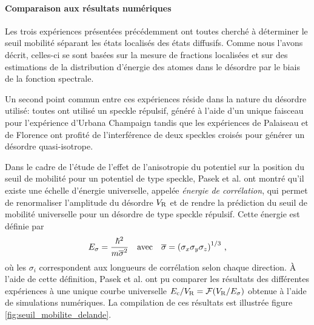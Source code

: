\paragraph*{Comparaison aux résultats numériques}
Les trois expériences présentées précédemment \citep{kondov2011three}\citep{jendrzejewski2012three}\citep{semeghini2015measurement} ont toutes cherché à déterminer le seuil mobilité séparant les états localisés des états diffusifs. Comme nous l'avons décrit, celles-ci se sont basées sur la mesure de fractions localisées et sur des estimations de la distribution d'énergie des atomes dans le désordre par le biais de la fonction spectrale.

Un second point commun entre ces expériences réside dans la nature du désordre utilisé: toutes ont utilisé un speckle répulsif, généré à l'aide d'un unique faisceau pour l'expérience d'Urbana Champaign tandis que les expériences de Palaiseau et de Florence ont profité de l'interférence de deux speckles croisés pour générer un désordre quasi-isotrope. 

Dans le cadre de l'étude de l'effet de l'anisotropie du potentiel sur la position du seuil de mobilité pour un potentiel de type speckle, Pasek et al. \citep{pasek2017anderson} ont montré qu'il existe une échelle d'énergie universelle, appelée \emph{énergie de corrélation}, qui permet de renormaliser l'amplitude du désordre $V_{\mathrm{R}}$ et de rendre la prédiction du seuil de mobilité universelle pour un désordre de type speckle répulsif. Cette énergie est définie par
\begin{equation}
E_{\sigma}=\frac{\hslash^2}{m\overline{\sigma}^2} \quad \text{avec} \quad \overline{\sigma}={(\sigma_x \sigma_y \sigma_z)}^{1/3} \text{ ,}
\end{equation}
où les $\sigma_i$ correspondent aux longueurs de corrélation selon chaque direction. À l'aide de cette définition, Pasek et al. ont pu comparer les résultats des différentes expériences à une unique courbe universelle $E_{\mathrm{c}}/V_{\mathrm{R}}=\mathcal{F}(V_{\mathrm{R}}/E_{\sigma})$ obtenue à l'aide de simulations numériques. La compilation de ces résultats est illustrée figure \ref{fig:seuil_mobilite_delande}.


